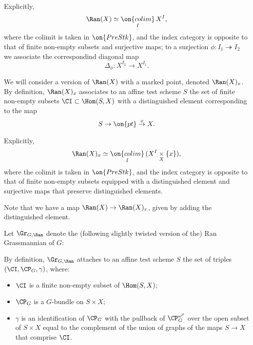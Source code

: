 \documentclass[9pt]{amsart}
\theoremstyle{definition}
\theoremstyle{remark}
\numberwithin{equation}{section}
\begin{document}
\medskip

Explicitly, 
$$\Ran(X)\simeq \underset{I}{\on{colim}}\, X^I,$$
where the colimit is taken in $\on{PreStk}$, and the index category is opposite to that of finite non-empty subsets and surjective maps;
to a surjection $\phi:I_1\twoheadrightarrow I_2$ we associate the correspondind diagonal map
$$\Delta_\phi:X^{I_2}\to X^{I_1}.$$

\sssec{}  \label{sss:marked}

We will consider a version of $\Ran(X)$ with a marked point, denoted $\Ran(X)_x$. By definition, $\Ran(X)_x$ associates 
to an affine test scheme $S$ the set of finite non-empty subsets $\CI\subset \Hom(S,X)$ with a distinguished element
corresponding to the map
$$S\to \on{pt}\overset{x}\to X.$$

\medskip

Explicitly, 
$$\Ran(X)_x\simeq \underset{I}{\on{colim}}\, (X^I\underset{X}\times \{x\}),$$
where the colimit is taken in $\on{PreStk}$, and the index category is opposite to that of finite non-empty subsets 
equipped with a distinguished element and surjective maps that preserve distinguished elements.

\medskip

Note that we have a map $\Ran(X)\to \Ran(X)_x$, given by adding the distinguished element.
 
\sssec{}

Let $\Gr_{G,\Ran}$ denote the (following slightly twisted version of the) Ran Grassmannian of $G$:

\medskip

By definition, $\Gr_{G,\Ran}$ 
attaches to an affine test scheme $S$ the set of triples $(\CI,\CP_G,\gamma)$, where:

\begin{itemize}

\item $\CI$ is a finite non-empty subset of $\Hom(S,X)$;

\item $\CP_G$ is a $G$-bundle on $S\times X$; 

\item $\gamma$ is an identification of $\CP_G$ with the pullback of $\CP_G^{\omega^\rho}$
over the open subset of $S\times X$ equal to the complement of the union of graphs of the maps $S\to X$ that comprise $\CI$. 

\end{itemize} 

\sssec{}
\end{document}
